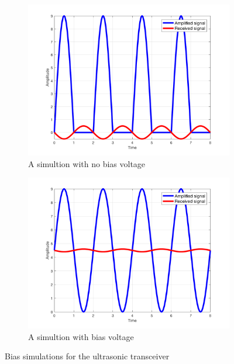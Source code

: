 \begin{figure}[H]
\centering
\begin{subfigure}{.5\textwidth}
  \centering
  \includegraphics[width=1.0\textwidth]{Figures/nonbias.PNG}
  \caption{A simultion with no bias voltage}
  \label{fig:nonbias}
\end{subfigure}%
\begin{subfigure}{.5\textwidth}
  \centering
  \includegraphics[width=1.0\textwidth]{Figures/bias.PNG}
  \caption{A simultion with bias voltage}
  \label{fig:bias}
\end{subfigure}
\caption{Bias simulations for the ultrasonic transceiver}
\label{fig:simulationsbias}
\end{figure}

